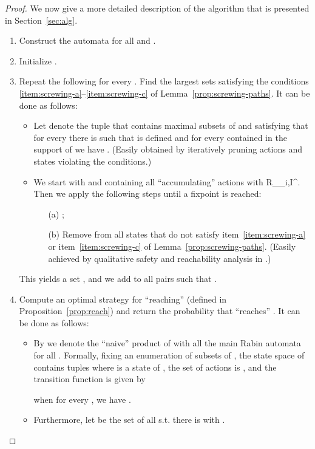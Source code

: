\documentclass[a4paper,UKenglish]{lipics}
\newcommand{\rabin}{R}
\newcommand{\fix}[1]{{#1^\star}}
\newcommand{\fixI}{\fix{I}}
\begin{document}
\begin{proof}
        We now give a more detailed description of the algorithm that is presented in Section~\ref{sec:alg}.
	
	\begin{enumerate}
		\item Construct the automata  for all  and .
\item Initialize .
		\item Repeat the following for every . Find the largest sets  satisfying the conditions \ref{item:screwing-a}--\ref{item:screwing-c} of Lemma~\ref{prop:screwing-paths}.
		It can be done as follows:
		\begin{itemize}
			\item Let  denote the tuple  that contains maximal subsets of  and 
			satisfying that for every  there is  such that  is defined and for every 
			contained in the support of  we have . (Easily obtained by iteratively pruning actions and states violating the conditions.)
			\item We start with  and  containing all ``accumulating'' actions  with \rabin_{\varphi_i,\fixI}. Then we apply the following steps until a fixpoint is reached:
			\begin{itemize}
				\item[(a)] ;
				\item[(b)] Remove from  all states that do not satisfy item~\ref{item:screwing-a} or item~\ref{item:screwing-c} of
				Lemma~\ref{prop:screwing-paths}. (Easily achieved by qualitative safety and reachability analysis in .)
			\end{itemize}
		\end{itemize}
		This yields a set , and we add to  all pairs  such that
		.
\item Compute an optimal strategy  for ``reaching''  (defined in Proposition~\ref{prop:reach}) and return the probability that  ``reaches'' . It can be done as follows:
		\begin{itemize}
			\item By  we denote the ``naive'' product of  with all the main Rabin automata 
			for all . Formally, fixing  an enumeration of subsets of ,
			the state space  of  contains tuples
			 where  is a state of ,
			the set of actions is , and the transition function 
			is given by
			
			when for every , we have .
			
			\item Furthermore, let  be the set of all  s.t.
			there is  with .
			

\end{itemize}
\end{enumerate}
\end{proof}
\end{document}
